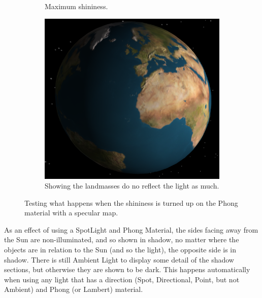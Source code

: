 \documentclass[12pt]{article}
\begin{document}
\begin{figure}[H]
\begin{subfigure}[b]{0.4\textwidth}
                \caption{Maximum shininess.}
                \label{fig:Specular 4.}
	 \end{subfigure}
	         \begin{subfigure}[b]{0.4\textwidth}
                \includegraphics[width=\textwidth]{images/specular5}
                \caption{Showing the landmasses do no reflect the light as much.}
                \label{fig:Specular 5.}
	 \end{subfigure}
	 \caption{Testing what happens when the shininess is turned up on the Phong material with a specular map.}
\end{figure}

As an effect of using a SpotLight and Phong Material, the sides facing away from the Sun are non-illuminated, and so shown in shadow, no matter where the objects are in relation to the Sun (and so the light), the opposite side is in shadow. There is still Ambient Light to display some detail of the shadow sections, but otherwise they are shown to be dark. This happens automatically when using any light that has a direction (Spot, Directional, Point, but not Ambient) and Phong (or Lambert) material.
\end{document}
